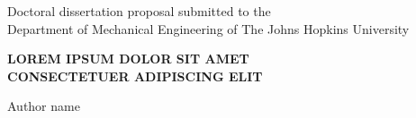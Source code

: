 \newcommand{\COMMENT}{\textcolor{red}}
\newcommand{\ADDCITATION}{\COMMENT{(ADD CITATION)}}


\newcommand{\say}[2]{\hfill\small\enquote{\textit{#1}}{ - \small\textsc{#2}.}}












\vspace*{0.025in}
\thispagestyle{empty}

\begin{center}
    Doctoral dissertation proposal submitted to the \\
    Department of Mechanical Engineering of The Johns Hopkins University \\
    
    \vspace{0.65in}

    \MakeUppercase{\textbf{LOREM IPSUM DOLOR SIT AMET\\CONSECTETUER ADIPISCING ELIT}}       %
    
    \vspace{0.25in}
    
    Author name   %
\end{center}


